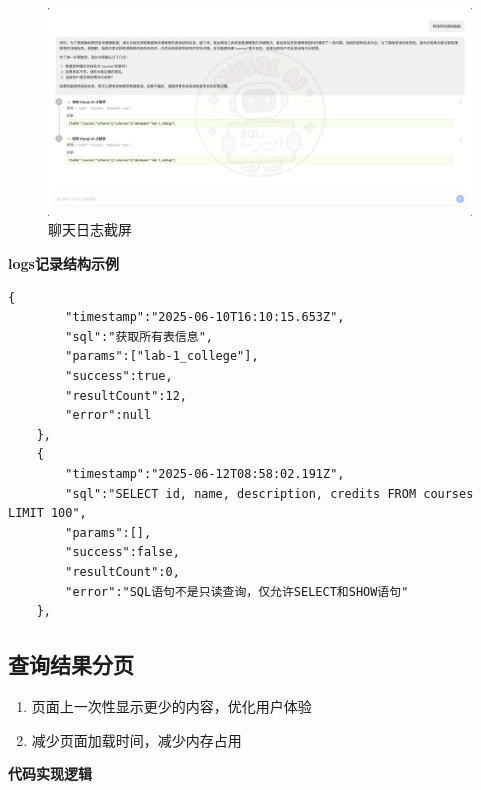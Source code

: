 \documentclass{article}
\begin{document}
	\begin{figure}[H]
		\centering
		\includegraphics[width=17cm]{./images/1.日志.png}
		\caption{聊天日志截屏}
	\end{figure}
	
	\textbf{logs记录结构示例}
	
	\begin{lstlisting}[title=logs记录结构示例, tabsize=4]
    {
    	"timestamp":"2025-06-10T16:10:15.653Z",
    	"sql":"获取所有表信息",
    	"params":["lab-1_college"],
    	"success":true,
    	"resultCount":12,
    	"error":null
    },
    {
    	"timestamp":"2025-06-12T08:58:02.191Z",
    	"sql":"SELECT id, name, description, credits FROM courses LIMIT 100",
    	"params":[],
    	"success":false,
    	"resultCount":0,
    	"error":"SQL语句不是只读查询，仅允许SELECT和SHOW语句"
    },
	\end{lstlisting}
	
	\subsection{查询结果分页}
	
	\begin{enumerate}[noitemsep, label={{\arabic*})}]
		\item 页面上一次性显示更少的内容，优化用户体验
		\item 减少页面加载时间，减少内存占用
	\end{enumerate}\textbf{}
	
	\textbf{代码实现逻辑}
	
\end{document}
